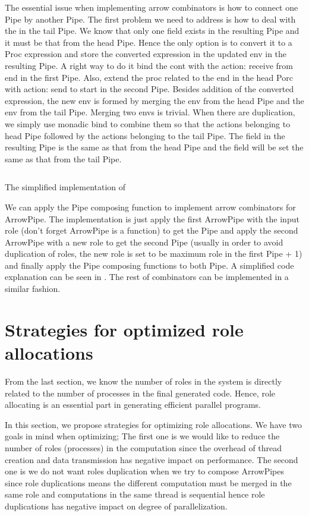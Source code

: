 The essential issue when implementing arrow combinators is how to connect one Pipe by another Pipe. The first problem we need to address is how to deal with the  in the tail Pipe. We know that only one  field exists in the resulting Pipe and it must be that from the head Pipe. Hence the only option is to convert it to a Proc expression and store the converted expression in the updated env in the resulting Pipe. A right way to do it bind the cont with the action: receive from end in the first Pipe. Also, extend the proc related to the end in the head Porc with action: send to start in the second Pipe. Besides addition of the converted  expression, the new env is formed by merging the env from the head Pipe and the env from the tail Pipe. Merging two envs is trivial. When there are duplication, we simply use monadic bind to combine them so that the actions belonging to head Pipe followed by the actions belonging to the tail Pipe. The  field in the resulting Pipe is the same as that from the head Pipe and the  field will be set the same as that from the tail Pipe.
\begin{listing}
\inputminted{Haskell}{arrow/impl.hs}
\caption{The simplified implementation of \hask{>>>}}
\label{arrowPipe:code:impl}
\end{listing}
We can apply the Pipe composing function to implement arrow combinators for ArrowPipe. The implementation is just apply the first ArrowPipe with the input role (don't forget ArrowPipe is a function) to get the Pipe and apply the second ArrowPipe with a new role to get the second Pipe (usually in order to avoid duplication of roles, the new role is set to be maximum role in the first Pipe + 1) and finally apply the Pipe composing functions to both Pipe. A simplified code explanation can be seen in . The rest of combinators can be implemented in a similar fashion.

\section{Strategies for optimized role allocations} \label{arrowPipe:roleAllc}
From the last section, we know the number of roles in the system is directly related to the number of processes in the final generated code. Hence, role allocating is an essential part in generating efficient parallel programs. 

In this section, we propose strategies for optimizing role allocations. We have two goals in mind when optimizing; The first one is we would like to reduce the number of roles (processes) in the computation since the overhead of thread creation and data transmission has negative impact on performance. The second one is we do not want roles duplication when we try to compose ArrowPipes since role duplications means the different computation must be merged in the same role and computations in the same thread is sequential hence role duplications has negative impact on degree of parallelization. 

